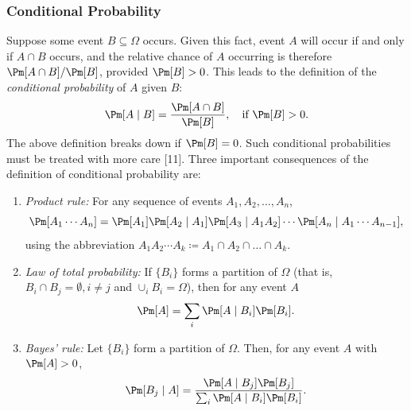 \subsubsection{Conditional Probability}
Suppose some event $B \subseteq \Omega$ occurs. Given this fact, event $A$ will occur if and only if $A \cap B$ occurs, and the relative chance of $A$ occurring is therefore $\Pm[A \cap B] / \Pm[B]$, provided $\Pm[B] > 0$. This leads to the definition of the \textit{conditional probability} of $A$ given $B$:
\begin{equation}
	\Pm[A \mid B] = \frac{\Pm[A \cap B]}{\Pm[B]}, \quad \text{if } \Pm[B] > 0. \label{eq:ConditionalProbability}
\end{equation}
The above definition breaks down if $\Pm[B] = 0$. Such conditional probabilities must be treated with more care [11].
Three important consequences of the definition of conditional probability are:
\begin{enumerate}
	\item \textit{Product rule:} For any sequence of events $A_1, A_2, \dots, A_n$,
	      \begin{equation}
		      \Pm[A_1 \cdots A_n] = \Pm[A_1] \Pm[A_2 \mid A_1] \Pm[A_3 \mid A_1 A_2] \cdots \Pm[A_n \mid A_1 \cdots A_{n-1}], \label{eq:ProductRule}
	      \end{equation}
	      using the abbreviation $A_1 A_2 \cdots A_k \coloneqq A_1 \cap A_2 \cap \dots \cap A_k$.
	\item \textit{Law of total probability:} If $\{B_i\}$ forms a partition of $\Omega$ (that is, $B_i \cap B_j = \emptyset, i \neq j$ and $\cup_i B_i = \Omega$), then for any event $A$
	      \begin{equation}
		      \Pm[A] = \sum_i \Pm[A \mid B_i] \Pm[B_i]. \label{eq:TotalProbability}
	      \end{equation}
	\item \textit{Bayes' rule:} Let $\{B_i\}$ form a partition of $\Omega$. Then, for any event $A$ with $\Pm[A] > 0$,
	      \begin{equation}
		      \Pm[B_j \mid A] = \frac{\Pm[A \mid B_j] \Pm[B_j]}{\sum_i \Pm[A \mid B_i] \Pm[B_i]}. \label{eq:BayesRule}
	      \end{equation}
\end{enumerate}

